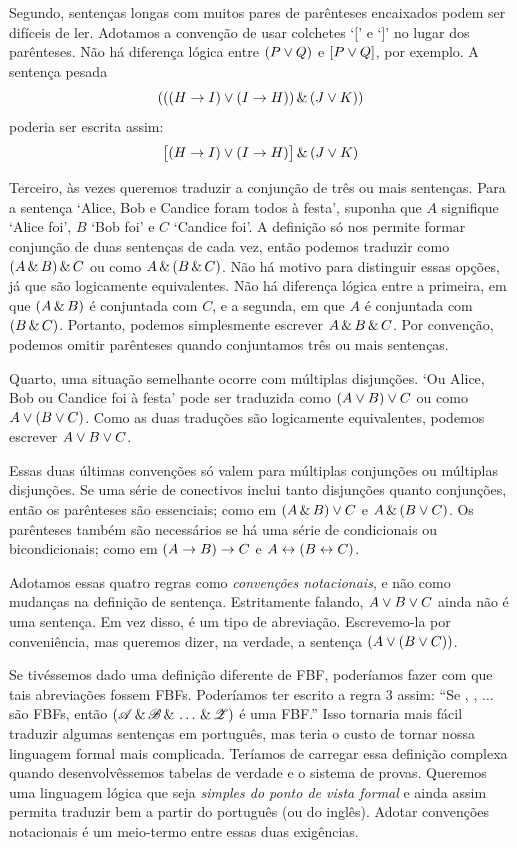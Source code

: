 Segundo, sentenças longas com muitos pares de parênteses encaixados podem ser difíceis de ler. Adotamos a convenção de usar colchetes `[' e `]' no lugar dos parênteses. Não há diferença lógica entre $(P\vee Q)$ e $[P\vee Q]$, por exemplo. A sentença pesada
$$(((H \rightarrow I) \vee (I \rightarrow H)) \,\&\, (J \vee K))$$
poderia ser escrita assim:
$$\bigl[(H \rightarrow I) \vee (I \rightarrow H)\bigr] \,\&\, (J \vee K)$$

Terceiro, às vezes queremos traduzir a conjunção de três ou mais sentenças. Para a sentença `Alice, Bob e Candice foram todos à festa', suponha que $A$ signifique `Alice foi', $B$ `Bob foi' e $C$ `Candice foi'. A definição só nos permite formar conjunção de duas sentenças de cada vez, então podemos traduzir como $(A \,\&\, B) \,\&\, C$ ou como $A \,\&\, (B \,\&\, C)$. Não há motivo para distinguir essas opções, já que são logicamente equivalentes. Não há diferença lógica entre a primeira, em que $(A \,\&\, B)$ é conjuntada com $C$, e a segunda, em que $A$ é conjuntada com $(B \,\&\, C)$. Portanto, podemos simplesmente escrever $A \,\&\, B \,\&\, C$. Por convenção, podemos omitir parênteses quando conjuntamos três ou mais sentenças.

Quarto, uma situação semelhante ocorre com múltiplas disjunções. `Ou Alice, Bob ou Candice foi à festa' pode ser traduzida como $(A \vee B) \vee C$ ou como $A \vee (B \vee C)$. Como as duas traduções são logicamente equivalentes, podemos escrever $A \vee B \vee C$.

Essas duas últimas convenções só valem para múltiplas conjunções ou múltiplas disjunções. Se uma série de conectivos inclui tanto disjunções quanto conjunções, então os parênteses são essenciais; como em $(A \,\&\, B) \vee C$ e $A \,\&\, (B \vee C)$. Os parênteses também são necessários se há uma série de condicionais ou bicondicionais; como em $(A \rightarrow B) \rightarrow C$ e $A \leftrightarrow (B \leftrightarrow C)$.

Adotamos essas quatro regras como \emph{convenções notacionais}, e não como mudanças na definição de sentença. Estritamente falando, $A \vee B \vee C$ ainda não é uma sentença. Em vez disso, é um tipo de abreviação. Escrevemo-la por conveniência, mas queremos dizer, na verdade, a sentença $(A \vee (B \vee C))$.

Se tivéssemos dado uma definição diferente de FBF, poderíamos fazer com que tais abreviações fossem FBFs. Poderíamos ter escrito a regra 3 assim: ``Se , , $\ldots$  são FBFs, então $(\mathscr{A}\,\&\,\mathscr{B}\,\&\,\ldots\,\&\,\mathscr{Z})$ é uma FBF.'' Isso tornaria mais fácil traduzir algumas sentenças em português, mas teria o custo de tornar nossa linguagem formal mais complicada. Teríamos de carregar essa definição complexa quando desenvolvêssemos tabelas de verdade e o sistema de provas. Queremos uma linguagem lógica que seja \emph{simples do ponto de vista formal} e ainda assim permita traduzir bem a partir do português (ou do inglês). Adotar convenções notacionais é um meio-termo entre essas duas exigências.



